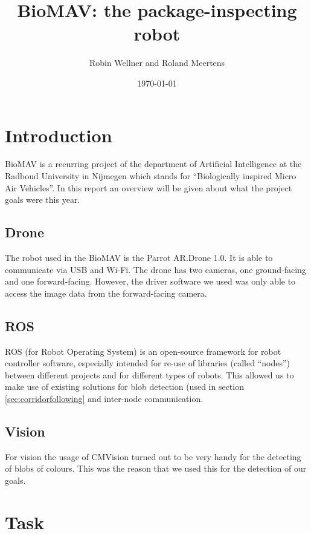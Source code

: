 \documentclass[a4paper,10pt]{article}
\begin{document}
\title{BioMAV: the package-inspecting robot}

\author{Robin Wellner and Roland Meertens}

\date{\today}

\maketitle

\section{Introduction}
BioMAV is a recurring project of the department of Artificial
Intelligence at the Radboud University in Nijmegen which stands for ``Biologically inspired Micro Air Vehicles''. In this report an overview will be given about what the project goals were this year. 

\subsection{Drone}
The robot used in the BioMAV is the Parrot AR.Drone 1.0. It is able to
communicate via USB and Wi-Fi. The drone has two cameras, one
ground-facing and one forward-facing. However, the driver software we
used was only able to access the image data from the forward-facing
camera.

\subsection{ROS}
ROS (for Robot Operating System) is an open-source framework for robot
controller software, especially intended for re-use of libraries
(called ``nodes'') between different projects and for different types of
robots. This allowed us to make use of existing solutions for blob
detection (used in section \ref{sec:corridorfollowing} and inter-node communication.

\subsection{Vision}
For vision the usage of CMVision turned out to be very handy for the detecting of blobs of colours. This was the reason that we used this for the detection of our goals. 
\section{Task}
\label{sec:task}
\end{document}
